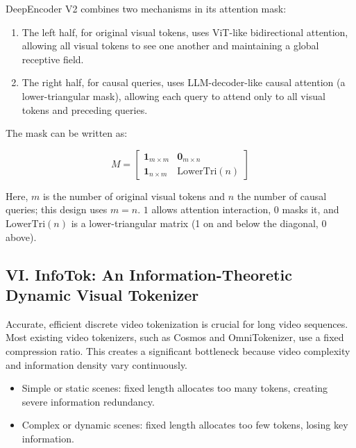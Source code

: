 DeepEncoder V2 combines two mechanisms in its attention mask:

\begin{enumerate}
\def\labelenumi{\arabic{enumi}.}
\tightlist
\item
  The left half, for original visual tokens, uses ViT-like bidirectional attention, allowing all visual tokens to see one another and maintaining a global receptive field.
\item
  The right half, for causal queries, uses LLM-decoder-like causal attention (a lower-triangular mask), allowing each query to attend only to all visual tokens and preceding queries.
\end{enumerate}

The mask can be written as:

\[
M=
\begin{bmatrix}
\mathbf{1}_{m\times m} & \mathbf{0}_{m\times n} \\
\mathbf{1}_{n\times m} & \mathrm{LowerTri}(n)
\end{bmatrix}
\]

Here, \(m\) is the number of original visual tokens and \(n\) the number of causal queries; this design uses \(m=n\). \(1\) allows attention interaction, \(0\) masks it, and \(\mathrm{LowerTri}(n)\) is a lower-triangular matrix (1 on and below the diagonal, 0 above).

\hypertarget{vi.-infotok-an-information-theoretic-dynamic-visual-tokenizer}{%
\subsection{VI. InfoTok: An Information-Theoretic Dynamic Visual Tokenizer}\label{vi.-infotok-an-information-theoretic-dynamic-visual-tokenizer}}

Accurate, efficient discrete video tokenization is crucial for long video sequences. Most existing video tokenizers, such as Cosmos and OmniTokenizer, use a fixed compression ratio. This creates a significant bottleneck because video complexity and information density vary continuously.

\begin{itemize}
\tightlist
\item
  Simple or static scenes: fixed length allocates too many tokens, creating severe information redundancy.
\item
  Complex or dynamic scenes: fixed length allocates too few tokens, losing key information.
\end{itemize}

